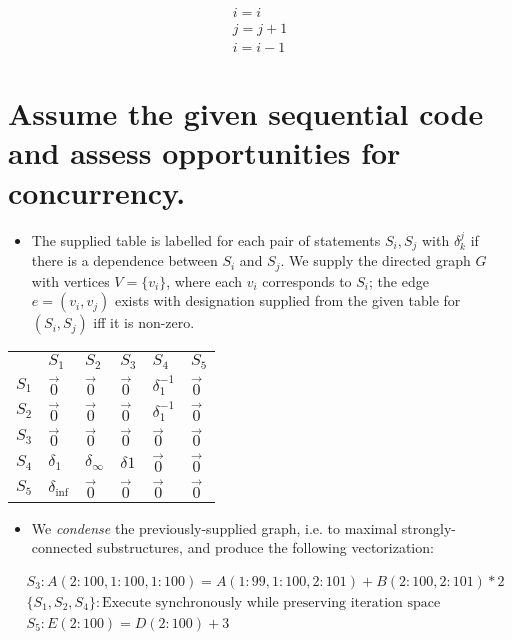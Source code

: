 \documentclass[11pt]{article}
\begin{document}
\begin{align}
  i = i \nonumber \\
  j = j + 1 \nonumber \\
  i = i - 1 \nonumber
\end{align}

\section{Assume the given sequential code and assess opportunities for concurrency.}
\label{sec:orgd33dfc7}
\begin{itemize}
\item The supplied table is labelled for each pair of statements \(S_{i}, S_{j}\) with \(\delta^{j}_{k}\) if there is a dependence between \(S_{i}\) and \(S_{j}\). We supply the directed graph \(G\) with vertices \(V = \{v_{i}\}\), where each \(v_{i}\) corresponds to \(S_{i}\); the edge \(e = (v_{i}, v_{j})\) exists with designation supplied from the given table for \((S_{i}, S_{j})\) iff it is non-zero.
\end{itemize}
\begin{center}
\begin{tabular}{llllll}
 & \(S_{1}\) & \(S_{2}\) & \(S_{3}\) & \(S_{4}\) & \(S_{5}\)\\
\(S_{1}\) & \(\vec{0}\) & \(\vec{0}\) & \(\vec{0}\) & \(\delta^{-1}_{1}\) & \(\vec{0}\)\\
\(S_{2}\) & \(\vec{0}\) & \(\vec{0}\) & \(\vec{0}\) & \(\delta^{-1}_{1}\) & \(\vec{0}\)\\
\(S_{3}\) & \(\vec{0}\) & \(\vec{0}\) & \(\vec{0}\) & \(\vec{0}\) & \(\vec{0}\)\\
\(S_{4}\) & \(\delta_{1}\) & \(\delta_{\infty}\) & \(\delta{1}\) & \(\vec{0}\) & \(\vec{0}\)\\
\(S_{5}\) & \(\delta_{\inf}\) & \(\vec{0}\) & \(\vec{0}\) & \(\vec{0}\) & \(\vec{0}\)\\
\end{tabular}
\end{center}
\begin{itemize}
\item We \emph{condense} the previously-supplied graph, i.e. to maximal strongly-connected substructures, and produce the following vectorization:
\end{itemize}
\begin{align*}
  & S_{3}: A(2:100, 1:100, 1:100) = A(1:99, 1:100, 2:101) + B(2:100, 2:101) * 2 \nonumber \\
  & \{S_{1}, S_{2}, S_{4}\}: \text{Execute synchronously while preserving iteration space} \nonumber \\
  & S_{5}: E(2:100) = D(2:100) + 3 \nonumber
\end{align*}
\end{document}
